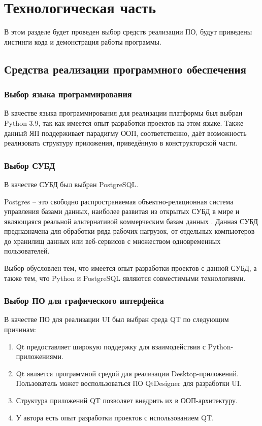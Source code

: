 \chapter{Технологическая часть}
В этом разделе будет проведен выбор средств реализации ПО, будут приведены листинги кода и демонстрация работы программы.

\section{Средства реализации программного обеспечения}
\subsection{Выбор языка программирования}
В качестве языка программирования для реализации платформы был выбран Python 3.9, так как имеется опыт разработки проектов на этом языке. 
Также данный ЯП поддерживает парадигму ООП, соответственно, даёт возможность реализовать структуру приложения, приведённую в конструкторской части.

\subsection{Выбор СУБД}
В качестве СУБД был выбран PostgreSQL.

Postgres \cite{postgresql} -- это свободно распространяемая объектно-реляционная система управления базами данных, наиболее развитая из открытых СУБД в мире и являющаяся реальной альтернативой коммерческим базам данных \cite{postgresql-fact}.
Данная СУБД предназначена для обработки ряда рабочих нагрузок, от отдельных компьютеров до хранилищ данных или веб-сервисов с множеством одновременных пользователей. 

Выбор обусловлен тем, что имеется опыт разработки проектов с данной СУБД, а также тем, что Python и PostgreSQL являются совместимыми технологиями.

\subsection{Выбор ПО для графического интерфейса}
В качестве ПО для реализации UI был выбран среда QT по следующим причинам:
\begin{enumerate}
	\item Qt предоставляет широкую поддержку для взаимодействия с Python-приложениями.
	\item Qt является программной средой для реализации Desktop-приложений. Пользователь может воспользоваться ПО QtDesigner для разработки UI.
	\item Структура приложений QT позволяет внедрить их в ООП-архитектуру.
	\item У автора есть опыт разработки проектов с использованием QT.
\end{enumerate} 


